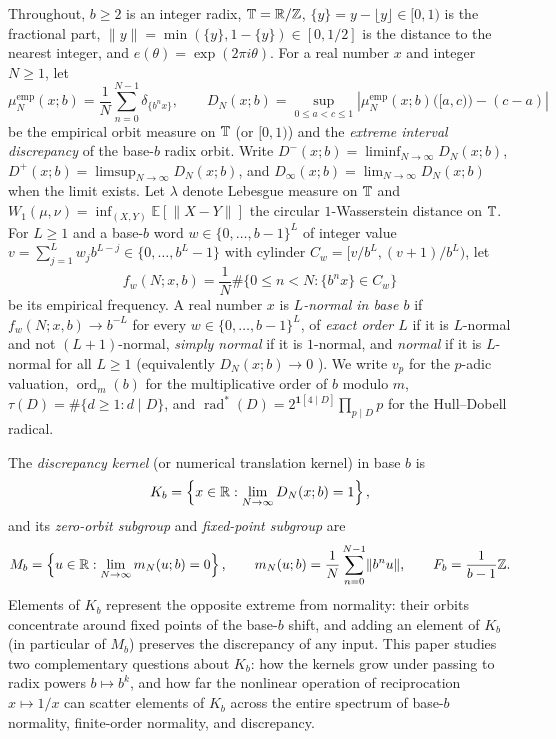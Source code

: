 \documentclass[11pt]{article}
\newcommand{\dist}[1]{\lVert #1\rVert}
\newcommand{\fr}[1]{\{#1\}}
\DeclareMathOperator{\ord}{ord}
\DeclareMathOperator{\rad}{rad}
\begin{document}
Throughout, $b\ge2$ is an integer radix, $\mathbb T=\mathbb R/\mathbb Z$, $\fr{y}=y-\lfloor y\rfloor\in[0,1)$ is the fractional part, $\dist{y}=\min(\fr{y},1-\fr{y})\in[0,1/2]$ is the distance to the nearest integer, and $e(\theta)=\exp(2\pi i\theta)$. For a real number $x$ and integer $N\ge1$, let
\[
\mu_N^{\mathrm{emp}}(x;b)=\frac1N\sum_{n=0}^{N-1}\delta_{\fr{b^nx}}, \qquad
D_N(x;b)=\sup_{0\le a<c\le 1}\left|\mu_N^{\mathrm{emp}}(x;b)\bigl([a,c)\bigr)-(c-a)\right|
\]
be the empirical orbit measure on $\mathbb T$ (or $[0,1)$) and the \emph{extreme interval discrepancy} of the base-$b$ radix orbit. Write $D^-(x;b)=\liminf_{N\to\infty}D_N(x;b)$, $D^+(x;b)=\limsup_{N\to\infty}D_N(x;b)$, and $D_\infty(x;b)=\lim_{N\to\infty}D_N(x;b)$ when the limit exists. Let $\lambda$ denote Lebesgue measure on $\mathbb T$ and $W_1(\mu,\nu)=\inf_{(X,Y)}\mathbb E[\dist{X-Y}]$ the circular $1$-Wasserstein distance on $\mathbb T$. For $L\ge1$ and a base-$b$ word $w\in\{0,\dots,b-1\}^L$ of integer value $v=\sum_{j=1}^L w_j b^{L-j}\in\{0,\dots,b^L-1\}$ with cylinder $C_w=[v/b^L,(v+1)/b^L)$, let
\[
f_w(N;x,b)=\frac1N\#\{0\le n<N:\fr{b^nx}\in C_w\}
\]
be its empirical frequency. A real number $x$ is \emph{$L$-normal in base $b$} if $f_w(N;x,b)\to b^{-L}$ for every $w\in\{0,\dots,b-1\}^L$, of \emph{exact order $L$} if it is $L$-normal and not $(L+1)$-normal, \emph{simply normal} if it is $1$-normal, and \emph{normal} if it is $L$-normal for all $L\ge1$ (equivalently $D_N(x;b)\to0$ \cite[Chapter~1, Theorem~8.1]{KN}). We write $v_p$ for the $p$-adic valuation, $\ord_m(b)$ for the multiplicative order of $b$ modulo $m$, $\tau(D)=\#\{d\ge1:d\mid D\}$, and $\rad^*(D)=2^{\mathbf 1[4\mid D]}\prod_{p\mid D}p$ for the Hull--Dobell radical.

The \emph{discrepancy kernel} (or numerical translation kernel) in base $b$ is
\[
K_b=\left\{x\in\mathbb R:\lim_{N\to\infty}D_N(x;b)=1\right\},
\]
and its \emph{zero-orbit subgroup} and \emph{fixed-point subgroup} are
\[
M_b=\left\{u\in\R:\lim_{N\to\infty}m_N(u;b)=0\right\},\qquad m_N(u;b)=\frac1N\sum_{n=0}^{N-1}\dist{b^nu},\qquad F_b=\frac1{b-1}\Z.
\]
Elements of $K_b$ represent the opposite extreme from normality: their orbits concentrate around fixed points of the base-$b$ shift, and adding an element of $K_b$ (in particular of $M_b$) preserves the discrepancy of any input. This paper studies two complementary questions about $K_b$: how the kernels grow under passing to radix powers $b\mapsto b^k$, and how far the nonlinear operation of reciprocation $x\mapsto 1/x$ can scatter elements of $K_b$ across the entire spectrum of base-$b$ normality, finite-order normality, and discrepancy.
\end{document}
